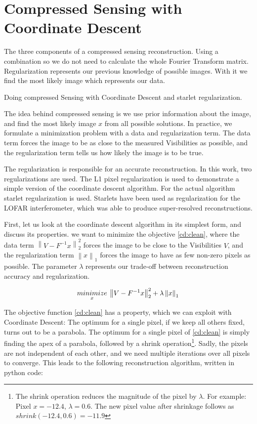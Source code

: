 \section{Compressed Sensing with Coordinate Descent}\label{cd}
The three components of a compressed sensing reconstruction. Using a combination so we do not need to calculate the whole Fourier Transform matrix. Regularization represents our previous knowledge of possible images. With it we find the most likely image which represents our data.

Doing compressed Sensing with Coordinate Descent and starlet regularization.






The idea behind compressed sensing is we use prior information about the image, and find the most likely image $x$ from all possible solutions. In practice, we formulate a minimization problem with a data and regularization term. The data term forces the image to be as close to the measured Visibilities as possible, and the regularization term tells us how likely the image is to be true. 

The regularization is responsible for an accurate reconstruction. In this work, two regularizations are used. The L1 pixel regularization is used to demonstrate a simple version of the coordinate descent algorithm. For the actual algorithm starlet regularization is used. Starlets have been used as regularization for the LOFAR interferometer\cite{girard2015sparse}, which was able to produce super-resolved reconstructions.

First, let us look at the coordinate descent algorithm in its simplest form, and discuss its properties. we want to minimize the objective \eqref{cd:clean}, where the data term $\left \| V - F^{-1}x \right \|_2^2$ forces the image to be close to the Visibilities $V$, and the regularization term $\left \| x \right \|_1$ forces the image to have as few non-zero pixels as possible. The parameter $\lambda$ represents our trade-off between reconstruction accuracy and regularization. 
 
\begin{equation}\label{cd:clean}
	\underset{x}{minimize} \: \left \| V - F^{-1}x \right \|_2^2 + \lambda \left \| x \right \|_1 \\
\end{equation}

The objective function \eqref{cd:clean} has a property, which we can exploit with Coordinate Descent: The optimum for a single pixel, if we keep all others fixed, turns out to be a parabola. The optimum for a single pixel of \eqref{cd:clean} is simply finding the apex of a parabola, followed by a shrink operation\footnote{The shrink operation reduces the magnitude of the pixel by $\lambda$. For example: Pixel $x = -12.4$, $\lambda = 0.6$. The new pixel value after shrinkage follows as $shrink(-12.4, 0.6) = -11.9$}. Sadly, the pixels are not independent of each other, and we need multiple iterations over all pixels to converge. This leads to the following reconstruction algorithm, written in python code:

